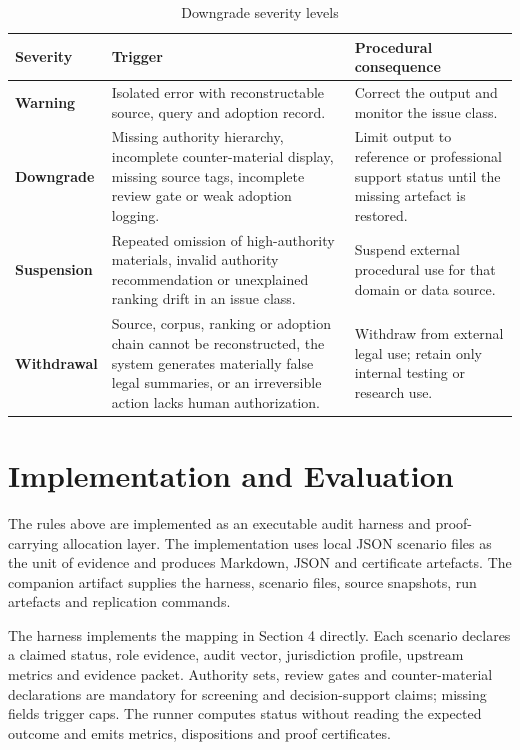 \documentclass[12pt,a4paper]{article}
\begin{document}
\begin{table}[htbp]
\centering
\caption{Downgrade severity levels}
\label{tab:downgrade-severity}
\renewcommand{\arraystretch}{1.15}
\begin{tabularx}{\textwidth}{>{\bfseries}p{2.8cm}YY}
\toprule
Severity & Trigger & Procedural consequence \\
\midrule
Warning & Isolated error with reconstructable source, query and adoption record. & Correct the output and monitor the issue class. \\
Downgrade & Missing authority hierarchy, incomplete counter-material display, missing source tags, incomplete review gate or weak adoption logging. & Limit output to reference or professional support status until the missing artefact is restored. \\
Suspension & Repeated omission of high-authority materials, invalid authority recommendation or unexplained ranking drift in an issue class. & Suspend external procedural use for that domain or data source. \\
Withdrawal & Source, corpus, ranking or adoption chain cannot be reconstructed, the system generates materially false legal summaries, or an irreversible action lacks human authorization. & Withdraw from external legal use; retain only internal testing or research use. \\
\bottomrule
\end{tabularx}
\end{table}

\section{Implementation and Evaluation}

The rules above are implemented as an executable audit harness and proof-carrying allocation layer. The implementation uses local JSON scenario files as the unit of evidence and produces Markdown, JSON and certificate artefacts. The companion artifact supplies the harness, scenario files, source snapshots, run artefacts and replication commands.

The harness implements the mapping in Section 4 directly. Each scenario declares a claimed status, role evidence, audit vector, jurisdiction profile, upstream metrics and evidence packet. Authority sets, review gates and counter-material declarations are mandatory for screening and decision-support claims; missing fields trigger caps. The runner computes status without reading the expected outcome and emits metrics, dispositions and proof certificates.
\end{document}
